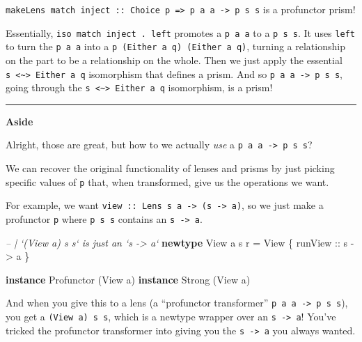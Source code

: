\documentclass[]{article}
\newenvironment{Shaded}{}{}
\newcommand{\CommentTok}[1]{\textcolor[rgb]{0.38,0.63,0.69}{\textit{#1}}}
\newcommand{\DataTypeTok}[1]{\textcolor[rgb]{0.56,0.13,0.00}{#1}}
\newcommand{\FunctionTok}[1]{\textcolor[rgb]{0.02,0.16,0.49}{#1}}
\newcommand{\KeywordTok}[1]{\textcolor[rgb]{0.00,0.44,0.13}{\textbf{#1}}}
\newcommand{\NormalTok}[1]{#1}
\newcommand{\OtherTok}[1]{\textcolor[rgb]{0.00,0.44,0.13}{#1}}
\begin{document}
\texttt{makeLens\ match\ inject\ ::\ Choice\ p\ =\textgreater{}\ p\ a\ a\ -\textgreater{}\ p\ s\ s}
is a profunctor prism!

Essentially, \texttt{iso\ match\ inject\ .\ left\textquotesingle{}} promotes a
\texttt{p\ a\ a} to a \texttt{p\ s\ s}. It uses \texttt{left\textquotesingle{}}
to turn the \texttt{p\ a\ a} into a \texttt{p\ (Either\ a\ q)\ (Either\ a\ q)},
turning a relationship on the part to be a relationship on the whole. Then we
just apply the essential
\texttt{s\ \textless{}\textasciitilde{}\textgreater{}\ Either\ a\ q} isomorphism
that defines a prism. And so \texttt{p\ a\ a\ -\textgreater{}\ p\ s\ s}, going
through the \texttt{s\ \textless{}\textasciitilde{}\textgreater{}\ Either\ a\ q}
isomorphism, is a prism!

\begin{center}\rule{0.5\linewidth}{\linethickness}\end{center}

\textbf{Aside}

Alright, those are great, but how to we actually \emph{use} a
\texttt{p\ a\ a\ -\textgreater{}\ p\ s\ s}?

We can recover the original functionality of lenses and prisms by just picking
specific values of \texttt{p} that, when transformed, give us the operations we
want.

For example, we want
\texttt{view\ ::\ Lens\textquotesingle{}\ s\ a\ -\textgreater{}\ (s\ -\textgreater{}\ a)},
so we just make a profunctor \texttt{p} where \texttt{p\ s\ s} contains an
\texttt{s\ -\textgreater{}\ a}.

\begin{Shaded}
\begin{Highlighting}[]
\CommentTok{-- | `(View a) s s` is just an `s -> a`}
\KeywordTok{newtype} \DataTypeTok{View}\NormalTok{ a s r }\FunctionTok{=} \DataTypeTok{View}\NormalTok{ \{}\OtherTok{ runView ::}\NormalTok{ s }\OtherTok{->}\NormalTok{ a \}}

\KeywordTok{instance} \DataTypeTok{Profunctor}\NormalTok{ (}\DataTypeTok{View}\NormalTok{ a)}
\KeywordTok{instance} \DataTypeTok{Strong}\NormalTok{ (}\DataTypeTok{View}\NormalTok{ a)}
\end{Highlighting}
\end{Shaded}

And when you give this to a lens (a ``profunctor transformer''
\texttt{p\ a\ a\ -\textgreater{}\ p\ s\ s}), you get a \texttt{(View\ a)\ s\ s},
which is a newtype wrapper over an \texttt{s\ -\textgreater{}\ a}! You've
tricked the profunctor transformer into giving you the
\texttt{s\ -\textgreater{}\ a} you always wanted.
\end{document}
